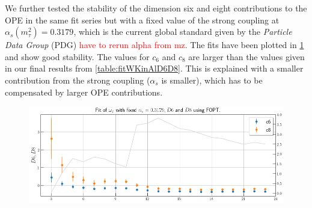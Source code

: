 \documentclass[../../index.tex]{subfiles}
\begin{document}
We further tested the stability of the dimension six and eight contributions to
the OPE in the same fit series but with a fixed value of the strong coupling at
$\alpha_s(m_\tau^2)=0.3179$, which is the current global standard given by the
\textit{Particle Data Group} (\textsc{PDG}) \cite{PDG2018} \textcolor{red}{have
  to rerun alpha from mz}. The fits have been plotted in \cref{fig:fitWKinD6D8}
and show good stability. The values for $c_6$ and $c_8$ are larger than the values given
in our final results from \cref{table:fitWKinAlD6D8}. This is explained with a
smaller contribution from the strong coupling ($\alpha_s$ is smaller), which has
to be compensated by larger OPE contributions. 
\begin{figure}
  \centering
  \includegraphics[width=\textwidth]{./images/fitWKinD6D8.png}
  \label{fig:fitWKinD6D8}
\end{figure}
\end{document}
